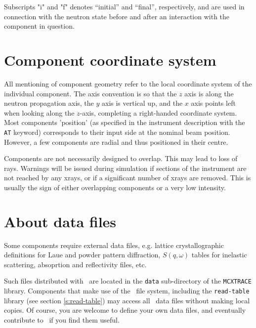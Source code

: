 Subscripts "i" and "f" denotes ``initial'' and ``final'', respectively,
and are used in connection with the neutron state before and after
an interaction with the component in question.


\section{Component coordinate system}
All mentioning of component geometry refer to
the local coordinate system of the individual component.
The axis convention is so that the $z$ axis is along
the neutron propagation axis, the $y$ axis is vertical up,
and the $x$ axis points left when looking along the $z$-axis,
completing a right-handed coordinate system.
Most components 'position' (as specified in the instrument description
with the \verb+AT+ keyword) corresponds to their input side at the nominal
beam position.
However, a few components are radial and thus positioned in their centre.

Components are not necessarily designed to overlap.
This may lead to loss of rays.
Warnings will be issued during simulation if sections of the instrument
are not reached by any xrays, or if a significant number of xrays are removed.
This is usually the sign of either overlapping components
or a very low intensity.

\section{About data files}
Some components require external data files,
e.g. lattice crystallographic definitions for Laue and powder pattern diffraction,
$S(q,\omega)$ tables for inelastic scattering,
absoprtion and reflectivity files, etc.

Such files distributed with \MCX\ are located in the
\verb+data+ sub-directory of the \verb+MCXTRACE+ library.
Components that make use of the \MCX\ file system,
including the \verb+read-table+ library (see section \ref{s:read-table})
may access all \MCX\ data files without making local copies.
Of course, you are welcome to define your own data files,
and eventually contribute to \MCX\ if you find them useful.

